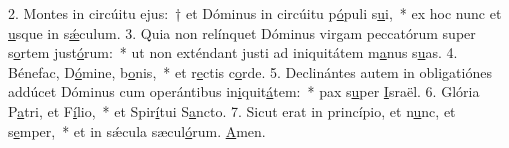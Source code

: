 2. Montes in circúitu ejus:~† et Dóminus in circúitu p\uline{ó}puli s\uline{u}i,~* ex hoc nunc et \uline{u}sque in s\uline{ǽ}culum.
3. Quia non relínquet Dóminus virgam peccatórum super s\uline{o}rtem just\uline{ó}rum:~* ut non exténdant justi ad iniquitátem m\uline{a}nus s\uline{u}as.
4. Bénefac, D\uline{ó}mine, b\uline{o}nis,~* et r\uline{e}ctis c\uline{o}rde.
5. Declinántes autem in obligatiónes addúcet Dóminus cum operántibus in\uline{i}quit\uline{á}tem:~* pax s\uline{u}per \uline{I}sraël.
6. Glória P\uline{a}tri, et F\uline{í}lio,~* et Spir\uline{í}tui S\uline{a}ncto.
7. Sicut erat in princípio, et n\uline{u}nc, et s\uline{e}mper,~* et in sǽcula sæcul\uline{ó}rum. \uline{A}men.

